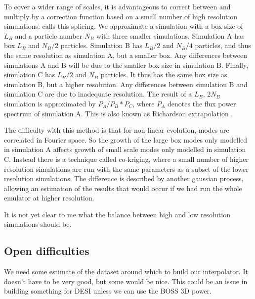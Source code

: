 \documentclass[10pt, aps, prd]{revtex4-1}
\begin{document}
To cover a wider range of scales, it is advantageous to correct between 
and multiply by a correction function based on a small number of high resolution simulations. \cite{McDonald:2004} calls this splicing. 
We approximate a simulation with a box size of $L_B$ and a particle number $N_B$ with three smaller simulations. Simulation A has 
box $L_B$ and $N_B/2$ particles. Simulation B has $L_B/2$ and $N_B/4$ particles, and thus the same resolution as simulation A, but a smaller box. 
Any differences between simulations A and B will be due to the smaller box size in simulation B. Finally, simulation C has $L_B/2$ and $N_B$ particles. 
It thus has the same box size as simulation B, but a higher resolution. Any differences between simulation B and simulation C are due to inadequate 
resolution. The result of a $L_B$, $2 N_B$ simulation is approximated by $P_A / P_B * P_C$, where $P_A$ denotes the flux power spectrum of simulation A.
This is also known as Richardson extrapolation \cite{Lukic:2013}.

The difficulty with this method is that for non-linear evolution, modes are correlated in Fourier space. So the growth of the large box modes only modelled 
in simulation A affects growth of small scale modes only modelled in simulation C. Instead there is a technique called co-kriging, where a small number 
of higher resolution simulations are run with the same parameters as a subset of the lower resolution simulations. The difference is described by 
another gaussian process, allowing an estimation of the results that would occur if we had run the whole emulator at higher resolution.

It is not yet clear to me what the balance between high and low resolution simulations should be.

\subsection{Open difficulties}

We need some estimate of the dataset around which to build our interpolator. It doesn't have to be very good, but some would be nice. This could
be an issue in building something for DESI unless we can use the BOSS 3D power.



\end{document}
